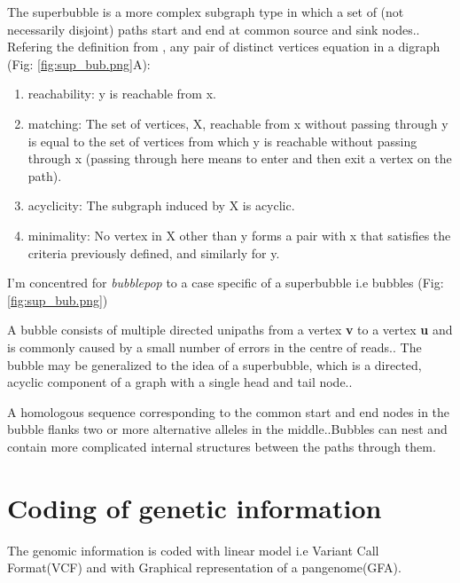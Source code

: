 The superbubble is a more complex subgraph type in which a set of (not necessarily disjoint) paths start and end at common source and sink nodes.\cite{paten2018superbubbles}.
Refering the definition from \cite{onodera2013detecting}, any pair of distinct vertices equation in a digraph (Fig: \ref{fig:sup_bub.png}A):

\begin{enumerate}
\item reachability: y is reachable from x.

\item matching: The set of vertices, X, reachable from x without passing through y is equal to the set of vertices from which y is reachable without passing through x (passing through here means to enter and then exit a vertex on the path).

\item acyclicity: The subgraph induced by X is acyclic.

\item minimality: No vertex in X other than y forms a pair with x that satisfies the criteria previously defined, and similarly for y.


\end{enumerate}

I'm concentred for \textit{bubblepop} to a case specific of a superbubble i.e  bubbles (Fig: \ref{fig:sup_bub.png})

A bubble consists of multiple directed unipaths from a vertex\textbf{ v} to a vertex \textbf{u} and is commonly caused by a small number of errors in the centre of reads.\cite{brankovic2016linear}. The bubble may be generalized to the idea of a superbubble, which is a directed, acyclic component of a graph with a single head and tail node.\cite{onodera2013detecting}.

A homologous sequence corresponding to the common start
and end nodes in the bubble flanks two or more alternative alleles in the middle.\cite{garrison2019graphical}.Bubbles can nest and contain more complicated internal structures between the paths
through them. 

\section{Coding of genetic information}

The genomic information is coded with linear model i.e Variant Call Format(VCF) and with Graphical representation of a pangenome(GFA).

